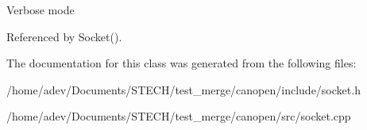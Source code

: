 Verbose mode 

Referenced by Socket().



The documentation for this class was generated from the following files\+:\begin{DoxyCompactItemize}
\item 
/home/adev/\+Documents/\+S\+T\+E\+C\+H/test\+\_\+merge/canopen/include/socket.\+h\item 
/home/adev/\+Documents/\+S\+T\+E\+C\+H/test\+\_\+merge/canopen/src/socket.\+cpp\end{DoxyCompactItemize}
